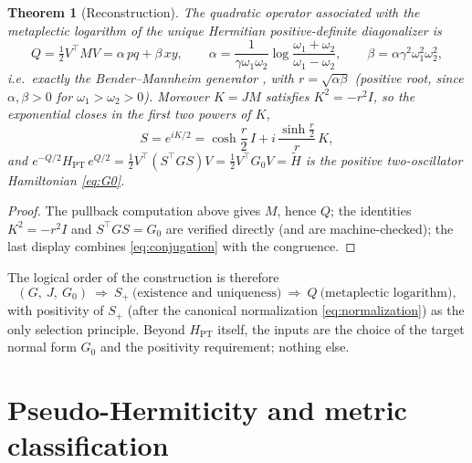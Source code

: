 \documentclass[11pt]{article}
\newtheorem{theorem}{Theorem}[section]
\theoremstyle{definition}
\theoremstyle{remark}
\newcommand{\w}{\omega}
\begin{document}
\begin{theorem}[Reconstruction]\label{thm:reconstruction}
The quadratic operator associated with the metaplectic logarithm of the
unique Hermitian positive-definite diagonalizer is
\begin{equation}
Q=\tfrac12V^{\top}MV=\alpha\,pq+\beta\,xy,
\qquad
\alpha=\frac{1}{\gamma\w_1\w_2}\log\frac{\w_1+\w_2}{\w_1-\w_2},
\qquad
\beta=\alpha\gamma^2\w_1^2\w_2^2 ,
\end{equation}
i.e.\ exactly the Bender--Mannheim generator \cite{BM2008PRD}, with
$r=\sqrt{\alpha\beta}$ (positive root, since $\alpha,\beta>0$ for
$\w_1>\w_2>0$).  Moreover $K=JM$ satisfies $K^2=-r^2I$, so the exponential
closes in the first two powers of $K$,
\begin{equation}
S=e^{iK/2}=\cosh\frac r2\,I+i\,\frac{\sinh\frac r2}{r}\,K ,
\end{equation}
and $e^{-Q/2}H_{\mathrm{PT}}\,e^{Q/2}
=\tfrac12V^{\top}(S^{\top}GS)V=\tfrac12V^{\top}G_0V=\widetilde H$
is the positive two-oscillator Hamiltonian \eqref{eq:G0}.
\end{theorem}

\begin{proof}
The pullback computation above gives $M$, hence $Q$; the identities
$K^2=-r^2I$ and $S^{\top}GS=G_0$ are verified directly (and are
machine-checked); the last display combines \eqref{eq:conjugation} with the
congruence.
\end{proof}

The logical order of the construction is therefore
\begin{equation}
(G,\ J,\ G_0)\ \Longrightarrow\ S_+\ \text{(existence and uniqueness)}
\ \Longrightarrow\ Q\ \text{(metaplectic logarithm)} ,
\end{equation}
with positivity of $S_+$ (after the canonical normalization
\eqref{eq:normalization}) as the only selection principle.  Beyond
$H_{\mathrm{PT}}$ itself, the inputs are the choice of the target normal form
$G_0$ and the positivity requirement; nothing else.

\section{Pseudo-Hermiticity and metric classification}\label{sec:pseudo}
\end{document}
